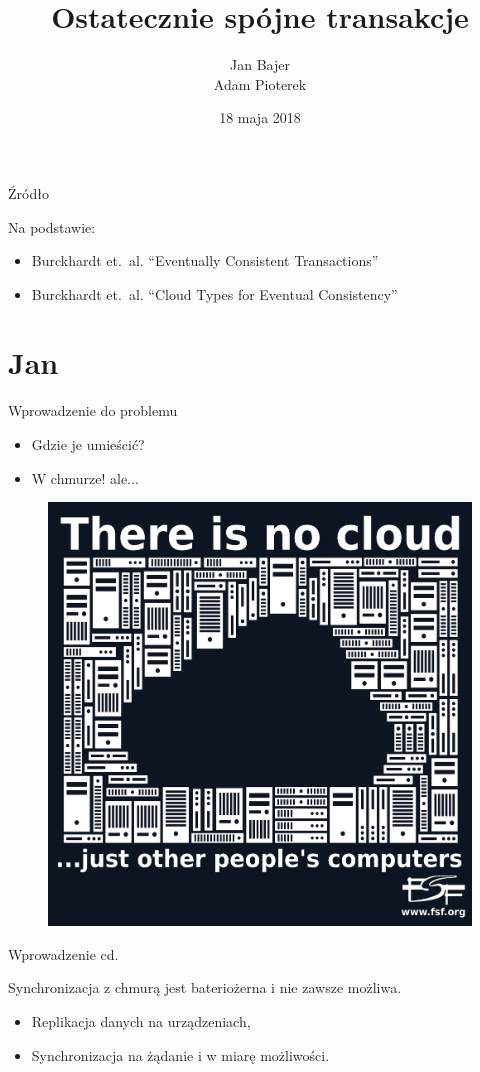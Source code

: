 \documentclass{beamer}
\title{Ostatecznie spójne transakcje}
\date{18 maja 2018}
\author{Jan Bajer\\Adam Pioterek}
\begin{document}
\begin{frame}
\titlepage{}
\end{frame}

\begin{frame}{Źródło}
    \begin{card}
        Na podstawie:
        \begin{itemize}
            \item Burckhardt et.\ al. “Eventually Consistent Transactions”
            \item Burckhardt et.\ al. “Cloud Types for Eventual Consistency”
        \end{itemize}
    \end{card}
\end{frame}

\section{Jan}

\begin{frame}{Wprowadzenie do problemu}
	\begin{card}
		\begin{itemize}[<+->]
			\item Gdzie je umieścić?
			\item W chmurze! ale...
		\end{itemize}
		 {
			\begin{figure}
				\centering
                \includegraphics[width=.4\textwidth]{thereisnocloud.pdf}
			\end{figure}
		}
	\end{card}
\end{frame}

\begin{frame}{Wprowadzenie cd.}
	\begin{card}
		Synchronizacja z chmurą jest bateriożerna i nie zawsze możliwa.
	\end{card}
	 {
		\begin{card}[Rozwiązanie?]
			\begin{itemize}
				\item Replikacja danych na urządzeniach, 
				\item Synchronizacja na żądanie i w miarę możliwości.
			\end{itemize}
		\end{card}
	}
\end{frame}
\end{document}
